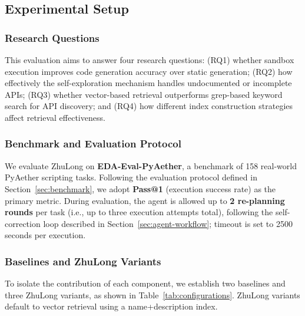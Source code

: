 \documentclass[anonymous, sigconf]{acmart}
\begin{document}
\subsection{Experimental Setup}
\label{sec:exp-setup}

\subsubsection{Research Questions}

This evaluation aims to answer four research questions: (RQ1) whether sandbox execution improves code generation accuracy over static generation; (RQ2) how effectively the self-exploration mechanism handles undocumented or incomplete APIs; (RQ3) whether vector-based retrieval outperforms grep-based keyword search for API discovery; and (RQ4) how different index construction strategies affect retrieval effectiveness.

\subsubsection{Benchmark and Evaluation Protocol}

We evaluate ZhuLong on \textbf{EDA-Eval-PyAether}, a benchmark of 158 real-world PyAether scripting tasks. Following the evaluation protocol defined in Section~\ref{sec:benchmark}, we adopt \textbf{Pass@1} (execution success rate) as the primary metric. During evaluation, the agent is allowed up to \textbf{2 re-planning rounds} per task (i.e., up to three execution attempts total), following the self-correction loop described in Section~\ref{sec:agent-workflow}; timeout is set to 2500 seconds per execution.

\subsubsection{Baselines and ZhuLong Variants}

To isolate the contribution of each component, we establish two baselines and three ZhuLong variants, as shown in Table~\ref{tab:configurations}. ZhuLong variants default to vector retrieval using a name+description index.
\end{document}
